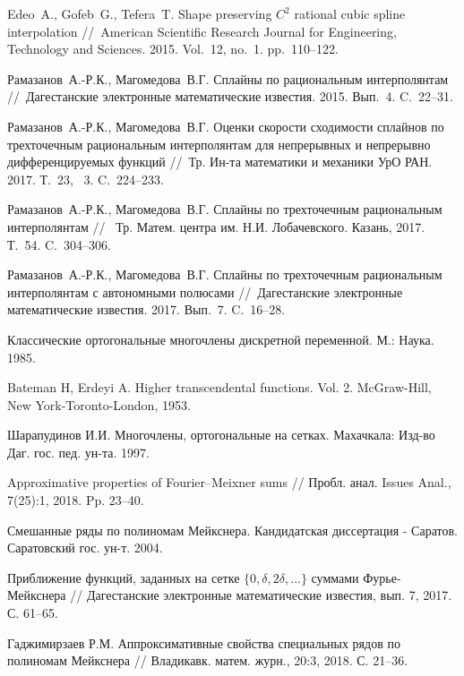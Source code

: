 \begin{thebibliography}{111}
Edeo~A., Gofeb~G., Tefera~T. Shape preserving $C^2$ rational
 cubic spline interpolation //~American Scientific Research Journal for Engineering, Technology and Sciences.
 2015. Vol.~12, no.~1. pp.~110--122.

Рамазанов~А.-Р.К., Магомедова~В.Г.  Сплайны по рациональным интерполянтам
//~Дагестанские электронные математические известия. 2015. Вып.~4. C.~22--31.


Рамазанов~А.-Р.К., Магомедова~В.Г. Оценки скорости сходимости сплайнов
 по трехточечным рациональным интерполянтам
 для непрерывных и непрерывно дифференцируемых функций
//~Тр. Ин-та математики и механики УрО РАН. 2017. Т.~23, \No~3. C.~224--233.


Рамазанов~А.-Р.К., Магомедова~В.Г.
Сплайны по трехточечным рациональным интерполянтам
//~ Тр. Матем. центра им. Н.И. Лобачевского. Казань, 2017. Т.~54. C.~304--306.


Рамазанов~А.-Р.К., Магомедова~В.Г. Сплайны по трехточечным рациональным
 интерполянтам с автономными полюсами
//~Дагестанские электронные математические известия. 2017. Вып.~7. C.~16--28.






 Классические ортогональные многочлены дискретной переменной. М.: Наука. 1985.

 {Bateman H, Erdeyi A.} Higher transcendental functions. Vol. 2. McGraw-Hill, New York-Toronto-London, 1953.


 {Шарапудинов И.И.} Многочлены, ортогональные на сетках. Махачкала: Изд-во Даг. гос. пед. ун-та. 1997.


 Approximative properties of Fourier–Meixner sums // Пробл. анал. Issues Anal., 7(25):1, 2018. Pp. 23--40.


 Смешанные ряды по полиномам Мейкснера. Кандидатская диссертация - Саратов. Саратовский гос. ун-т. 2004.

 Приближение функций, заданных на сетке $\{0, \delta, 2\delta, \ldots\}$ суммами Фурье-Мейкснера // Дагестанские электронные математические известия, вып. 7, 2017. С. 61--65.


 {Гаджимирзаев Р.М.} Аппроксимативные свойства специальных рядов по полиномам Мейкснера // Владикавк. матем. журн., 20:3, 2018. С. 21--36.


\end{thebibliography}
